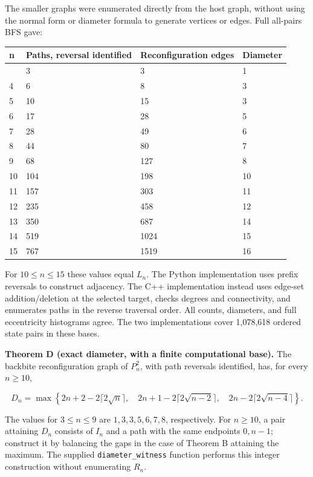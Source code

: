 \documentclass[11pt,a4paper]{article}
\begin{document}
The smaller graphs were enumerated directly from the host graph, without using the normal form or diameter formula to generate vertices or edges. Full all-pairs BFS gave:

\begin{longtable}[]{@{}llll@{}}
\toprule\noalign{}
n & Paths, reversal identified & Reconfiguration edges & Diameter \\
\midrule\noalign{}
\endhead
\bottomrule\noalign{}
\endlastfoot
3 & 3 & 3 & 1 \\
4 & 6 & 8 & 3 \\
5 & 10 & 15 & 3 \\
6 & 17 & 28 & 5 \\
7 & 28 & 49 & 6 \\
8 & 44 & 80 & 7 \\
9 & 68 & 127 & 8 \\
10 & 104 & 198 & 10 \\
11 & 157 & 303 & 11 \\
12 & 235 & 458 & 12 \\
13 & 350 & 687 & 14 \\
14 & 519 & 1024 & 15 \\
15 & 767 & 1519 & 16 \\
\end{longtable}

For \(10\le n\le15\) these values equal \(L_n\). The Python implementation uses prefix reversals to construct adjacency. The C++ implementation instead uses edge-set addition/deletion at the selected target, checks degrees and connectivity, and enumerates paths in the reverse traversal order. All counts, diameters, and full eccentricity histograms agree. The two implementations cover 1,078,618 ordered state pairs in these bases.

\textbf{Theorem D (exact diameter, with a finite computational base).} The backbite reconfiguration graph of \(P_n^2\), with path reversals identified, has, for every \(n\ge10\),

\[\boxed{D_n=\max\left\{
2n+2-2\lceil2\sqrt n\rceil,\quad
2n+1-2\lceil2\sqrt{n-2}\rceil,\quad
2n-2\lceil2\sqrt{n-4}\rceil\right\}.}\]

The values for \(3\le n\le9\) are \(1,3,3,5,6,7,8\), respectively. For \(n\ge10\), a pair attaining \(D_n\) consists of \(I_n\) and a path with the same endpoints \(0,n-1\); construct it by balancing the gaps in the case of Theorem B attaining the maximum. The supplied \texttt{diameter\_witness} function performs this integer construction without enumerating \(R_n\).
\end{document}

